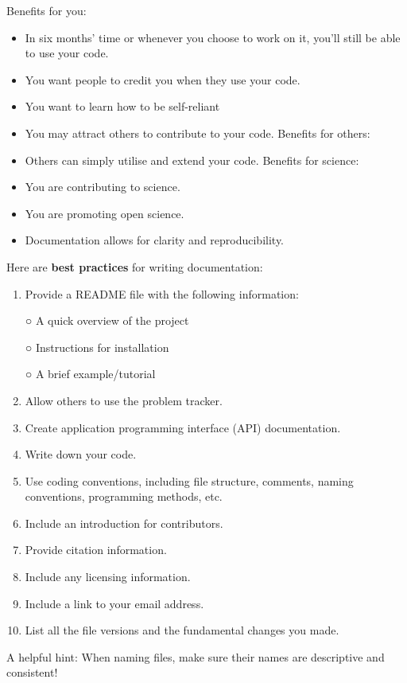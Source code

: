 \documentclass[
]{book}
\providecommand{\tightlist}{%
  \setlength{\itemsep}{0pt}\setlength{\parskip}{0pt}}
\begin{document}
Benefits for you:

\begin{itemize}
\tightlist
\item
  In six months' time or whenever you choose to work on it, you'll still be able to use your code.
\item
  You want people to credit you when they use your code.
\item
  You want to learn how to be self-reliant
\item
  You may attract others to contribute to your code. Benefits for others:
\item
  Others can simply utilise and extend your code. Benefits for science:
\item
  You are contributing to science.
\item
  You are promoting open science.
\item
  Documentation allows for clarity and reproducibility.
\end{itemize}

Here are \textbf{best practices} for writing documentation:

\begin{enumerate}
\def\labelenumi{\arabic{enumi}.}
\item
  Provide a README file with the following information:

  ○ A quick overview of the project

  ○ Instructions for installation

  ○ A brief example/tutorial
\item
  Allow others to use the problem tracker.
\item
  Create application programming interface (API) documentation.
\item
  Write down your code.
\item
  Use coding conventions, including file structure, comments, naming conventions, programming methods, etc.
\item
  Include an introduction for contributors.
\item
  Provide citation information.
\item
  Include any licensing information.
\item
  Include a link to your email address.
\item
  List all the file versions and the fundamental changes you made.
\end{enumerate}

A helpful hint: When naming files, make sure their names are descriptive and consistent!
\end{document}
